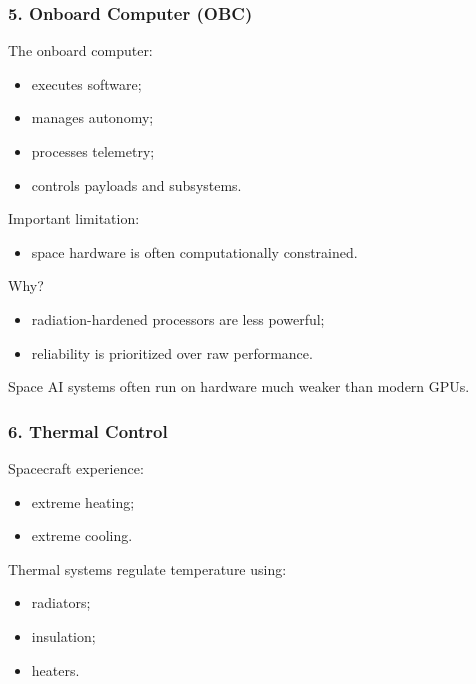 \documentclass[10pt,a4paper,twocolumn]{article}
\begin{document}

\subsubsection*{5. Onboard Computer (OBC)}

The onboard computer:
\begin{itemize}
    \item executes software;
    \item manages autonomy;
    \item processes telemetry;
    \item controls payloads and subsystems.
\end{itemize}

Important limitation:
\begin{itemize}
    \item space hardware is often computationally constrained.
\end{itemize}

Why?
\begin{itemize}
    \item radiation-hardened processors are less powerful;
    \item reliability is prioritized over raw performance.
\end{itemize}

\begin{warningbox}
    Space AI systems often run on hardware much weaker than modern GPUs.
\end{warningbox}


\subsubsection*{6. Thermal Control}

Spacecraft experience:
\begin{itemize}
    \item extreme heating;
    \item extreme cooling.
\end{itemize}

Thermal systems regulate temperature using:
\begin{itemize}
    \item radiators;
    \item insulation;
    \item heaters.
\end{itemize}
\end{document}

